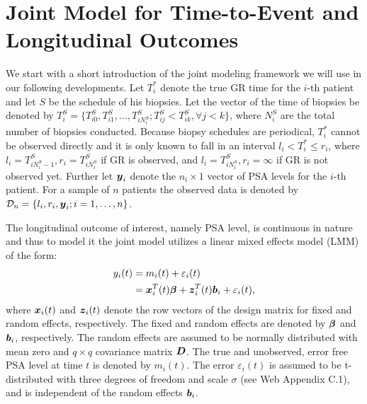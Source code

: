 \section{Joint Model for Time-to-Event and Longitudinal Outcomes}
\label{sec : jm_framework}
We start with a short introduction of the joint modeling framework we will use in our following developments. Let $T_i^*$ denote the true GR time for the $i$-th patient and let $S$ be the schedule of his biopsies. Let the vector of the time of biopsies be denoted by $T_i^S = \{T^S_{i0}, T^S_{i1}, \ldots, T^S_{i{N_i^S}}; T^S_{ij} < T^S_{ik}, \forall j<k\}$, where $N_i^S$ are the total number of biopsies conducted. Because biopsy schedules are periodical, $T_i^*$ cannot be observed directly and it is only known to fall in an interval $l_i < T_i^* \leq r_i$, where $l_i = T^S_{i{N_i^S - 1}}, r_i = T^S_{i{N_i^S}}$ if GR is observed, and $l_i = T^S_{i{N_i^S}}, r_i=\infty$ if GR is not observed yet. Further let $\boldsymbol{y}_i$ denote the $n_i \times 1$ vector of PSA levels for the $i$-th patient. For a sample of $n$ patients the observed data is denoted by $\mathcal{D}_n = \{l_i, r_i, \boldsymbol{y}_i; i = 1, \ldots, n\}$.

The longitudinal outcome of interest, namely PSA level, is continuous in nature and thus to model it the joint model utilizes a linear mixed effects model (LMM) of the form:
\begin{equation*}
\begin{split}
y_i(t) &= m_i(t) + \varepsilon_i(t)\\
&=\boldsymbol{x}_i^T(t) \boldsymbol{\beta} + \boldsymbol{z}_i^T(t) \boldsymbol{b}_i + \varepsilon_i(t),
\end{split}
\end{equation*}
where $\boldsymbol{x}_i(t)$ and $\boldsymbol{z}_i(t)$ denote the row vectors of the design matrix for fixed and random effects, respectively. The fixed and random effects are denoted by $\boldsymbol{\beta}$ and $\boldsymbol{b}_i$, respectively. The random effects are assumed to be normally distributed with mean zero and $q \times q$ covariance matrix $\boldsymbol{D}$. The true and unobserved, error free PSA level at time $t$ is denoted by $m_i(t)$. The error $\varepsilon_i(t)$ is assumed to be t-distributed with three degrees of freedom and scale $\sigma$ (see Web Appendix C.1), and is independent of the random effects $\boldsymbol{b}_i$.

